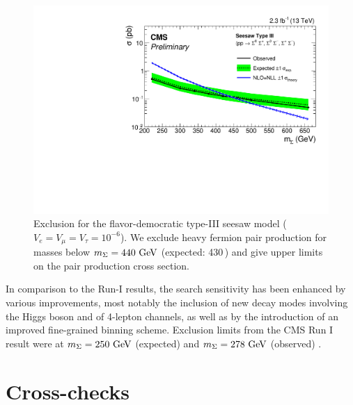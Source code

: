 \begin{figure}
\begin{center}
	\includegraphics[width=.8\textwidth]{Results/exclusion}
	\caption{Exclusion for the flavor-democratic type-III seesaw model ($V_e = V_\mu = V_\tau = 10^{-6}$). We exclude heavy fermion pair production for masses below $m_\Sigma = 440\,\,\text{Ge\hspace{-.08em}V}$ (expected: 430\,\GeV) and give upper limits on the pair production cross section.
	\label{fig:exclusion}}
\end{center}
\end{figure}

In comparison to the Run-I results, the search sensitivity has been enhanced by various improvements, most notably the inclusion of new decay modes involving the Higgs boson and of 4-lepton channels, as well as by the introduction of an improved fine-grained binning scheme. Exclusion limits from the CMS Run I result were at $m_\Sigma = 250\,\,\text{Ge\hspace{-.08em}V}$ (expected) and $m_\Sigma = 278\,\,\text{Ge\hspace{-.08em}V}$ (observed) \cite{CMS-PAS-EXO-14-001}.

\section{Cross-checks}
